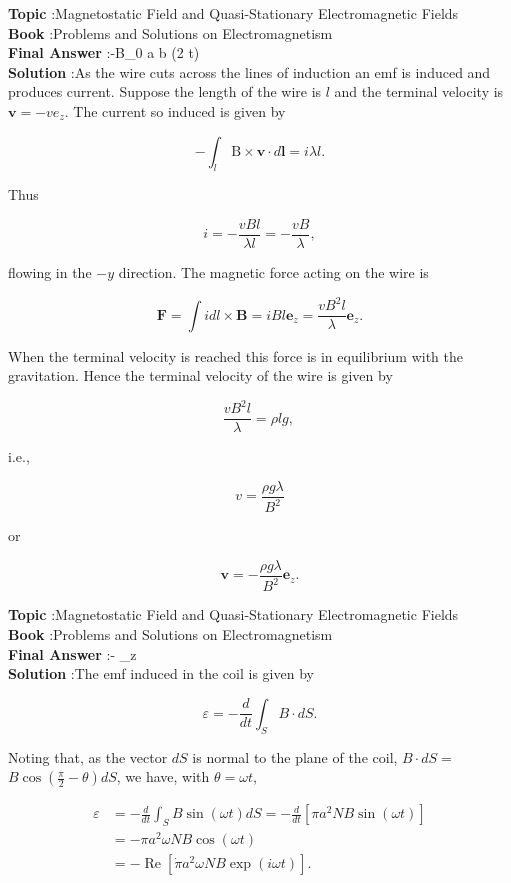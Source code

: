 \documentclass[10pt]{article}
\begin{document}
\textbf{Topic} :Magnetostatic Field and Quasi-Stationary Electromagnetic Fields\\
\textbf{Book} :Problems and Solutions on Electromagnetism\\
\textbf{Final Answer} :-B_{0} a b \omega \cos (2 \omega t)\\


\textbf{Solution} :As the wire cuts across the lines of induction an emf is induced and produces current. Suppose the length of the wire is $l$ and the terminal velocity is $\mathbf{v}=-v e_{z}$. The current so induced is given by

$$
-\int_{l} \mathrm{~B} \times \mathbf{v} \cdot d \mathbf{l}=i \lambda l .
$$

Thus

$$
i=-\frac{v B l}{\lambda l}=-\frac{v B}{\lambda},
$$

flowing in the $-y$ direction. The magnetic force acting on the wire is

$$
\mathbf{F}=\int i d l \times \mathbf{B}=i B l \mathbf{e}_{z}=\frac{v B^{2} l}{\lambda} \mathbf{e}_{z} .
$$

When the terminal velocity is reached this force is in equilibrium with the gravitation. Hence the terminal velocity of the wire is given by

$$
\frac{v B^{2} l}{\lambda}=\rho l g \text {, }
$$

i.e.,

$$
v=\frac{\rho g \lambda}{B^{2}}
$$

or

$$
\mathbf{v}=-\frac{\rho g \lambda}{B^{2}} \mathbf{e}_{z} .
$$

\textbf{Topic} :Magnetostatic Field and Quasi-Stationary Electromagnetic Fields\\
\textbf{Book} :Problems and Solutions on Electromagnetism\\
\textbf{Final Answer} :- _{z}\\


\textbf{Solution} :The emf induced in the coil is given by

$$
\varepsilon=-\frac{d}{d t} \int_{S} B \cdot d S .
$$

Noting that, as the vector $d S$ is normal to the plane of the coil, $B \cdot d S=$ $B \cos \left(\frac{\pi}{2}-\theta\right) d S$, we have, with $\theta=\omega t$,

$$
\begin{aligned}
\varepsilon &=-\frac{d}{d t} \int_{S} B \sin (\omega t) d S=-\frac{d}{d t}\left[\pi a^{2} N B \sin (\omega t)\right] \\
&=-\pi a^{2} \omega N B \cos (\omega t) \\
&=-\operatorname{Re}\left[\dot{\pi} a^{2} \omega N B \exp (i \omega t)\right] .
\end{aligned}
$$
\end{document}
